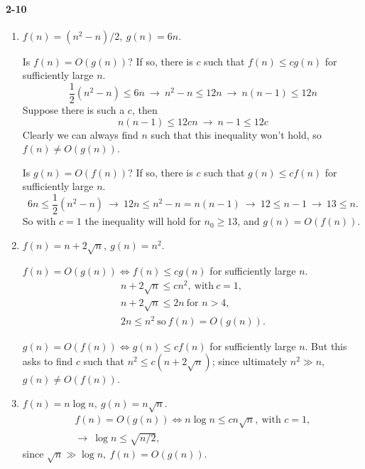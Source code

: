 \documentclass{report}
\begin{document}
\paragraph{2-10}
\begin{enumerate}[label=(\alph*)]
	\item $f(n) = (n^2 - n)/2,\ g(n) = 6n.$

		Is $f(n) = O(g(n))$? If so, there is $c$ such that $f(n) \le cg(n)$
		for sufficiently large $n$.
		\begin{equation*}
			\frac{1}{2}\left(n^2 - n\right) \le 6n
				\ \rightarrow\ n^2 - n \le 12n
				\ \rightarrow\ n(n-1) \le 12n
		\end{equation*}
		Suppose there is such a $c$, then
		\begin{equation*}
			n(n-1) \le 12cn\ \rightarrow\ n-1 \le 12c
		\end{equation*}
		Clearly we can always find $n$ such that this inequality won't hold,
		so $f(n) \ne O(g(n))$.

		Is $g(n) = O(f(n))$? If so, there is $c$ such that $g(n) \le cf(n)$
		for sufficiently large $n$.
		\begin{equation*}
			6n \le \frac{1}{2}\left(n^2 - n\right)
			\ \rightarrow\ 12n \le n^2 - n = n(n-1)
			\ \rightarrow\ 12 \le n - 1
			\ \rightarrow\ 13 \le n.
		\end{equation*}
		So with $c = 1$ the inequality will hold for $n_0 \ge 13$, and $g(n) = O(f(n))$.

	\item $f(n) = n + 2\sqrt{n},\ g(n) = n^2.$

		$f(n) = O(g(n)) \Leftrightarrow f(n) \le cg(n)$ for sufficiently large $n$.
		\begin{gather*}
			n + 2\sqrt{n} \le cn^2,\ \text{with}\ c = 1, \\
			n + 2\sqrt{n} \le 2n\ \text{for $n > 4$}, \\
			2n \le n^2\ \text{so}\ f(n) = O(g(n)).
		\end{gather*}

		$g(n) = O(f(n)) \Leftrightarrow g(n) \le cf(n)$ for sufficiently large $n$. But
		this asks to find $c$ such that $n^2 \le c\left(n + 2\sqrt{n}\right)$; since
		ultimately $n^2 \gg n$, $g(n) \ne O(f(n))$.

	\item $f(n) = n\log n,\ g(n) = n\sqrt{n}.$
		\begin{gather*}
			f(n) = O(g(n)) \Leftrightarrow n\log n \le cn\sqrt{n},\ \text{with $c=1,$} \\ 
			\rightarrow\ \log n \le \sqrt{n/2},
		\end{gather*}
		since $\sqrt{n} \gg \log n,\ f(n) = O(g(n)).$


\end{enumerate}
\end{document}
